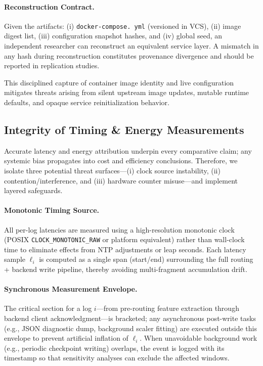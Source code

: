 \paragraph{Reconstruction Contract.} Given the artifacts: (i) \texttt{docker-compose. yml} (versioned in VCS), (ii) image digest list, (iii) configuration snapshot hashes, and (iv) global seed, an independent researcher can reconstruct an equivalent service layer. A mismatch in any hash during reconstruction constitutes provenance divergence and should be reported in replication studies.

This disciplined capture of container image identity and live configuration mitigates threats arising from silent upstream image updates, mutable runtime defaults, and opaque service reinitialization behavior.
\subsection{Integrity of Timing \& Energy Measurements}
\label{subsec:timing_energy_integrity}
Accurate latency and energy attribution underpin every comparative claim; any systemic bias propagates into cost and efficiency conclusions. Therefore, we isolate three potential threat surfaces—(i) clock source instability, (ii) contention/interference, and (iii) hardware counter misuse—and implement layered safeguards.

\paragraph{Monotonic Timing Source.} All per-log latencies are measured using a high-resolution monotonic clock (POSIX \texttt{CLOCK\_MONOTONIC\_RAW} or platform equivalent) rather than wall-clock time to eliminate effects from NTP adjustments or leap seconds. Each latency sample $\ell_i$ is computed as a single span (start/end) surrounding the full routing + backend write pipeline, thereby avoiding multi-fragment accumulation drift.

\paragraph{Synchronous Measurement Envelope.} The critical section for a log $i$—from pre-routing feature extraction through backend client acknowledgment—is bracketed; any asynchronous post-write tasks (e.g., JSON diagnostic dump, background scaler fitting) are executed outside this envelope to prevent artificial inflation of $\ell_i$. When unavoidable background work (e.g., periodic checkpoint writing) overlaps, the event is logged with its timestamp so that sensitivity analyses can exclude the affected windows.

